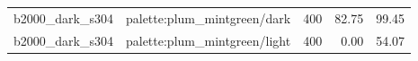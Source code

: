 \begin{longtable}{l>{\raggedright\arraybackslash}p{.42\linewidth}rrr}
b2000\_\allowbreak{}dark\_\allowbreak{}s304 & %
palette:plum\_\allowbreak{}mintgreen/dark & %
400 & %
82.75 & %
99.45 \\ %

b2000\_\allowbreak{}dark\_\allowbreak{}s304 & %
palette:plum\_\allowbreak{}mintgreen/light & %
400 & %
0.00 & %
54.07 \\ %


\end{longtable}

